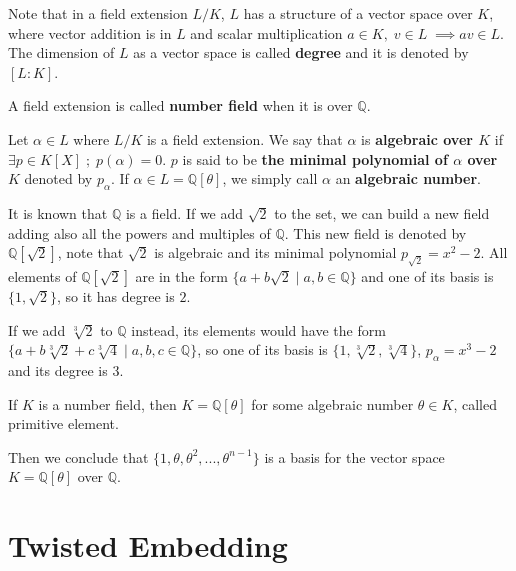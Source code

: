 \documentclass[Ingles]{ic-tese-v3}
\begin{document}
Note that in a field extension $L/K$, $L$ has a structure of a vector space over
$K$, where vector addition is in $L$ and scalar multiplication $a \in K, \; v \in L
\; \implies av \in L$. The dimension of $L$ as a vector space is called
\textbf{degree} and it is denoted by $[L:K]$.

\begin{definition}
  A field extension is called \textbf{number field} when it is over $\mathbb{Q}$.
\end{definition}

\begin{definition}
  Let $\alpha \in L$ where $L/K$ is a field extension. We say that $\alpha$ is
  \textbf{algebraic over $K$} if $\exists p \in K[X] \;;\; p(\alpha) = 0$. $p$ is said to be
  \textbf{the minimal polynomial of $\alpha$ over $K$} denoted by $p_\alpha$. If $\alpha \in L =
  \mathbb{Q}[\theta]$, we simply call $\alpha$ an \textbf{algebraic number}.
\end{definition}

\begin{example}
  It is known that $\mathbb{Q}$ is a field. If we add $\sqrt{2}$ to the set, we
  can build a new field adding also all the powers and multiples of
  $\mathbb{Q}$. This new field is denoted by $\mathbb{Q}[\sqrt{2}]$, note that
  $\sqrt{2}$ is algebraic and its minimal polynomial $p_{\sqrt{2}} = x^2-2$. All
  elements of $\mathbb{Q}[\sqrt{2}]$ are in the form $\{a+b\sqrt{2} \;|\; a,b \in
  \mathbb{Q}\}$ and one of its basis is $\{1, \sqrt{2}\}$, so it has degree is
  $2$.
\end{example}

\begin{example}
  If we add $\sqrt[3]{2}$ to $\mathbb{Q}$ instead, its elements would have the
  form $\{a + b\sqrt[3]{2} + c\sqrt[3]{4} \;|\; a,b,c \in \mathbb{Q}\}$, so one of
  its basis is $\{1 ,\sqrt[3]{2} ,\sqrt[3]{4}\}$, $p_\alpha = x^3 - 2$ and its degree
  is $3$.
\end{example}

\begin{theorem}
   If $K$ is a number field, then $K = \mathbb{Q}[\theta]$ for some
  algebraic number $\theta \in K$, called primitive element.
\end{theorem}

Then we conclude that $\{1, \theta, \theta^2, ... , \theta^{n-1}\}$ is a basis for the vector
space $K = \mathbb{Q}[\theta]$ over $\mathbb{Q}$.

\section{Twisted Embedding}
\label{sec:twisted-embeddding}
\end{document}
